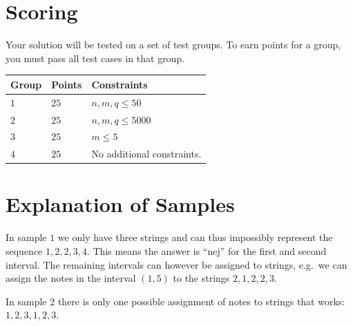 \section*{Scoring}
Your solution will be tested on a set of test groups. To earn points for a group, you must pass all test cases in that group.


\noindent
\begin{tabular}{| l | l | p{12cm} |}
  \hline
  \textbf{Group} & \textbf{Points} & \textbf{Constraints} \\ \hline
  $1$    & $25$      & $n,m,q \le 50$ \\ \hline
  $2$    & $25$      & $n,m,q \le 5000$ \\ \hline
  $3$    & $25$      & $m \le 5$  \\ \hline
  $4$    & $25$      & No additional constraints. \\ \hline
\end{tabular}

\section*{Explanation of Samples}
In sample $1$ we only have three strings and can thus impossibly represent the sequence $1, 2, 2, 3, 4$.
This means the answer is ``nej'' for the first and second interval.
The remaining intervals can however be assigned to strings, e.g.\ we can assign the notes in the interval $(1, 5)$ to the strings $2, 1, 2, 2, 3$.

In sample $2$ there is only one possible assignment of notes to strings that works: $1, 2, 3, 1, 2, 3$.
